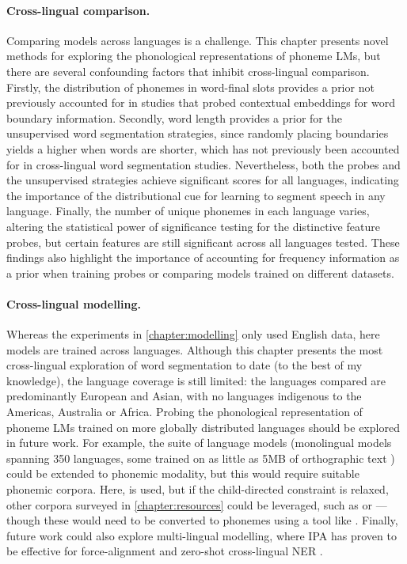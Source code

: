 \paragraph{Cross-lingual comparison.} Comparing models across languages is a challenge. This chapter presents novel methods for exploring the phonological representations of phoneme LMs, but there are several confounding factors that inhibit cross-lingual comparison. Firstly, the distribution of phonemes in word-final slots provides a prior not previously accounted for in studies that probed contextual embeddings for word boundary information. Secondly, word length provides a prior for the unsupervised word segmentation strategies, since randomly placing boundaries yields a higher \fscore when words are shorter, which has not previously been accounted for in cross-lingual word segmentation studies. Nevertheless, both the probes and the unsupervised strategies achieve significant scores for all  languages, indicating the importance of the distributional cue for learning to segment speech in any language. Finally, the number of unique phonemes in each language varies, altering the statistical power of significance testing for the distinctive feature probes, but certain features are still significant across all  languages tested. These findings also highlight the importance of accounting for frequency information as a prior when training probes or comparing models trained on different datasets.


\paragraph{Cross-lingual modelling.} Whereas the experiments in \cref{chapter:modelling} only used English data, here models are trained across  languages. Although this chapter presents the most cross-lingual exploration of word segmentation to date (to the best of my knowledge), the language coverage is still limited: the languages compared are predominantly European and Asian, with no languages indigenous to the Americas, Australia or Africa. Probing the phonological representation of phoneme LMs trained on more globally distributed languages should be explored in future work. For example, the  suite of language models (monolingual models spanning 350 languages, some trained on as little as 5MB of orthographic text \citep{chang2024goldfish}) could be extended to phonemic modality, but this would require suitable phonemic corpora. Here, \ipachildes is used, but if the child-directed constraint is relaxed, other corpora surveyed in \cref{chapter:resources} could be leveraged, such as  \citep{9383459} or  \citep{8683536} --- though these would need to be converted to phonemes using a tool like \gpp. Finally, future work could also explore multi-lingual modelling, where IPA has proven to be effective for force-alignment \citep{zhu-etal-2024-taste} and zero-shot cross-lingual NER \citep{sohn2024zero}.

